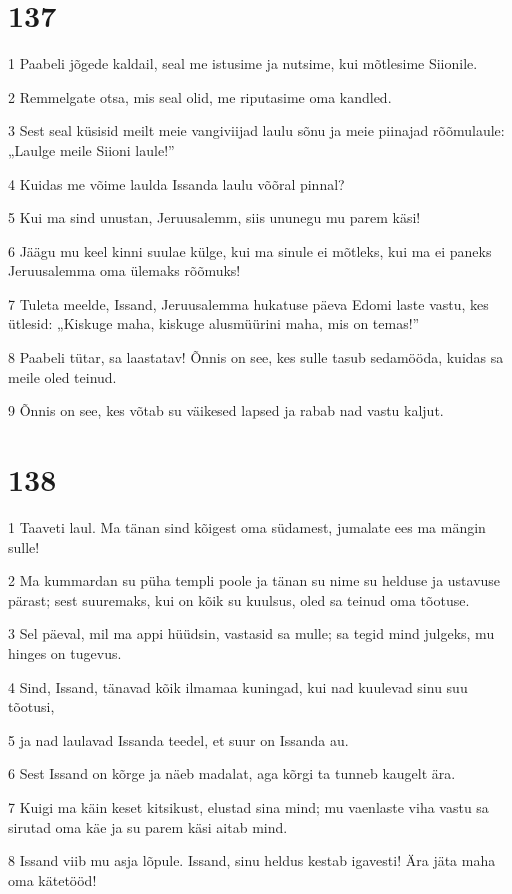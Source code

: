 \chapter{137}

\par 1 Paabeli jõgede kaldail, seal me istusime ja nutsime, kui mõtlesime Siionile.
\par 2 Remmelgate otsa, mis seal olid, me riputasime oma kandled.
\par 3 Sest seal küsisid meilt meie vangiviijad laulu sõnu ja meie piinajad rõõmulaule: „Laulge meile Siioni laule!”
\par 4 Kuidas me võime laulda Issanda laulu võõral pinnal?
\par 5 Kui ma sind unustan, Jeruusalemm, siis ununegu mu parem käsi!
\par 6 Jäägu mu keel kinni suulae külge, kui ma sinule ei mõtleks, kui ma ei paneks Jeruusalemma oma ülemaks rõõmuks!
\par 7 Tuleta meelde, Issand, Jeruusalemma hukatuse päeva Edomi laste vastu, kes ütlesid: „Kiskuge maha, kiskuge alusmüürini maha, mis on temas!”
\par 8 Paabeli tütar, sa laastatav! Õnnis on see, kes sulle tasub sedamööda, kuidas sa meile oled teinud.
\par 9 Õnnis on see, kes võtab su väikesed lapsed ja rabab nad vastu kaljut.

\chapter{138}

\par 1 Taaveti laul. Ma tänan sind kõigest oma südamest, jumalate ees ma mängin sulle!
\par 2 Ma kummardan su püha templi poole ja tänan su nime su helduse ja ustavuse pärast; sest suuremaks, kui on kõik su kuulsus, oled sa teinud oma tõotuse.
\par 3 Sel päeval, mil ma appi hüüdsin, vastasid sa mulle; sa tegid mind julgeks, mu hinges on tugevus.
\par 4 Sind, Issand, tänavad kõik ilmamaa kuningad, kui nad kuulevad sinu suu tõotusi,
\par 5 ja nad laulavad Issanda teedel, et suur on Issanda au.
\par 6 Sest Issand on kõrge ja näeb madalat, aga kõrgi ta tunneb kaugelt ära.
\par 7 Kuigi ma käin keset kitsikust, elustad sina mind; mu vaenlaste viha vastu sa sirutad oma käe ja su parem käsi aitab mind.
\par 8 Issand viib mu asja lõpule. Issand, sinu heldus kestab igavesti! Ära jäta maha oma kätetööd!

